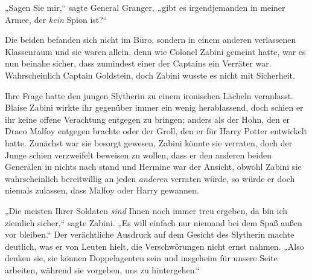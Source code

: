 „Sagen Sie mir,“ sagte General Granger, „gibt es irgendjemanden in meiner Armee, der \emph{kein} Spion ist?“

Die beiden befanden sich nicht im Büro, sondern in einem anderen verlassenen Klassenraum und sie waren allein, denn wie Colonel Zabini gemeint hatte, war es nun beinahe sicher, dass zumindest einer der Captains ein Verräter war. Wahrscheinlich Captain Goldstein, doch Zabini wusste es nicht mit Sicherheit.

Ihre Frage hatte den jungen Slytherin zu einem ironischen Lächeln veranlasst. Blaise Zabini wirkte ihr gegenüber immer ein wenig herablassend, doch schien er ihr keine offene Verachtung entgegen zu bringen; anders als der Hohn, den er Draco Malfoy entgegen brachte oder der Groll, den er für Harry Potter entwickelt hatte. Zunächst war sie besorgt gewesen, Zabini könnte sie verraten, doch der Junge schien verzweifelt beweisen zu wollen, dass er den anderen beiden Generälen in nichts nach stand und Hermine war der Ansicht, obwohl Zabini sie wahrscheinlich bereitwillig an jeden \emph{anderen} verraten würde, so würde er doch niemals zulassen, dass Malfoy oder Harry gewannen.

„Die meisten Ihrer Soldaten \emph{sind} Ihnen noch immer treu ergeben, da bin ich ziemlich sicher,“ sagte Zabini. „Es will einfach nur niemand bei dem Spaß außen vor bleiben.“ Der verächtliche Ausdruck auf dem Gesicht des Slytherin machte deutlich, was er von Leuten hielt, die Verschwörungen nicht ernst nahmen. „Also denken sie, sie können Doppelagenten sein und insgeheim für unsere Seite arbeiten, während sie vorgeben, uns zu hintergehen.“

